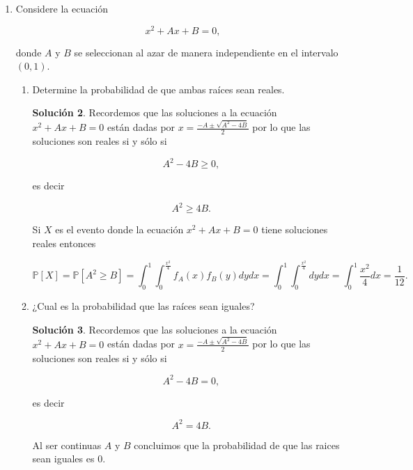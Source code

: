 \documentclass[letterpaper]{article}
\theoremstyle{definition}
\theoremstyle{lemathm}
\theoremstyle{lemathm}
\newtheorem{sol}{Solución}
\theoremstyle{lemathm}
\theoremstyle{lemademthm}
\newcommand{\pars}[1]{\left( #1 \right) }
\newcommand{\bracs}[1]{\left[ #1 \right] }
\newcommand{\PP}{\mathbb{P}}
\newcommand{\1}{\mathbbm{1}}
\begin{document}
\begin{enumerate}
\begin{enumerate}
			\begin{sol}
				Puesto que

				\[f_{X,Y}\pars{x,y} = \lambda^2 e^{-\lambda y} \neq -\lambda^3 y e^{-\lambda y} = f_{X}\pars{x}f_{Y}\pars{y},\]

				concluimos que $X$ y $Y$ no son independientes.
			\end{sol}
		\end{enumerate}
	
		\item Considere la ecuación
		
		\[x^2+Ax+B=0,\]

		donde $A$ y $B$ se seleccionan al azar de manera independiente en el intervalo $\pars{0,1}$.

		\begin{enumerate}
			\item Determine la probabilidad de que ambas raíces sean reales.
			
			\begin{sol}
				Recordemos que las soluciones a la ecuación $x^2+Ax+B=0$ están dadas por $x = \frac{-A \pm \sqrt{A^2-4B}}{2}$ por lo que las soluciones son reales si y sólo si

				\[A^2-4B \geq 0,\]

				es decir

				\[A^2 \geq 4B.\]

				Si $X$ es el evento donde la ecuación $x^2+Ax+B=0$ tiene soluciones reales entonces

				\[\PP\bracs{X} = \PP\bracs{A^2 \geq B} = \int_{0}^{1}\int_{0}^{\frac{x^2}{4}} f_A\pars{x}f_B\pars{y} dydx = \int_{0}^{1}\int_{0}^{\frac{x^2}{4}} dydx = \int_{0}^{1}\frac{x^2}{4} dx = \frac{1}{12}.\]
			\end{sol}

			\item ¿Cual es la probabilidad que las raíces sean iguales?
			
			\begin{sol}
				Recordemos que las soluciones a la ecuación $x^2+Ax+B=0$ están dadas por $x = \frac{-A \pm \sqrt{A^2-4B}}{2}$ por lo que las soluciones son reales si y sólo si

				\[A^2-4B = 0,\]

				es decir

				\[A^2 = 4B.\]

				Al ser continuas $A$ y $B$ concluimos que la probabilidad de que las raices sean iguales es $0$.
			\end{sol}


\end{enumerate}
\end{enumerate}
\end{document}
